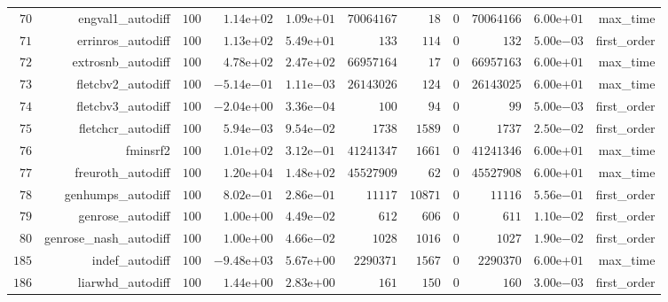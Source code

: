 \documentclass[varwidth=20cm,crop=true]{standalone}
\begin{document}
\begin{longtable}{rrrrrrrrrrr}
  \(    70\) & engval1\_autodiff & \(   100\) & \( 1.14\)e\(+02\) & \( 1.09\)e\(+01\) & \(70064167\) & \(    18\) & \(     0\) & \(70064166\) & \( 6.00\)e\(+01\) & max\_time \\
  \(    71\) & errinros\_autodiff & \(   100\) & \( 1.13\)e\(+02\) & \( 5.49\)e\(+01\) & \(   133\) & \(   114\) & \(     0\) & \(   132\) & \( 5.00\)e\(-03\) & first\_order \\
  \(    72\) & extrosnb\_autodiff & \(   100\) & \( 4.78\)e\(+02\) & \( 2.47\)e\(+02\) & \(66957164\) & \(    17\) & \(     0\) & \(66957163\) & \( 6.00\)e\(+01\) & max\_time \\
  \(    73\) & fletcbv2\_autodiff & \(   100\) & \(-5.14\)e\(-01\) & \( 1.11\)e\(-03\) & \(26143026\) & \(   124\) & \(     0\) & \(26143025\) & \( 6.00\)e\(+01\) & max\_time \\
  \(    74\) & fletcbv3\_autodiff & \(   100\) & \(-2.04\)e\(+00\) & \( 3.36\)e\(-04\) & \(   100\) & \(    94\) & \(     0\) & \(    99\) & \( 5.00\)e\(-03\) & first\_order \\
  \(    75\) & fletchcr\_autodiff & \(   100\) & \( 5.94\)e\(-03\) & \( 9.54\)e\(-02\) & \(  1738\) & \(  1589\) & \(     0\) & \(  1737\) & \( 2.50\)e\(-02\) & first\_order \\
  \(    76\) & fminsrf2 & \(   100\) & \( 1.01\)e\(+02\) & \( 3.12\)e\(-01\) & \(41241347\) & \(  1661\) & \(     0\) & \(41241346\) & \( 6.00\)e\(+01\) & max\_time \\
  \(    77\) & freuroth\_autodiff & \(   100\) & \( 1.20\)e\(+04\) & \( 1.48\)e\(+02\) & \(45527909\) & \(    62\) & \(     0\) & \(45527908\) & \( 6.00\)e\(+01\) & max\_time \\
  \(    78\) & genhumps\_autodiff & \(   100\) & \( 8.02\)e\(-01\) & \( 2.86\)e\(-01\) & \( 11117\) & \( 10871\) & \(     0\) & \( 11116\) & \( 5.56\)e\(-01\) & first\_order \\
  \(    79\) & genrose\_autodiff & \(   100\) & \( 1.00\)e\(+00\) & \( 4.49\)e\(-02\) & \(   612\) & \(   606\) & \(     0\) & \(   611\) & \( 1.10\)e\(-02\) & first\_order \\
  \(    80\) & genrose\_nash\_autodiff & \(   100\) & \( 1.00\)e\(+00\) & \( 4.66\)e\(-02\) & \(  1028\) & \(  1016\) & \(     0\) & \(  1027\) & \( 1.90\)e\(-02\) & first\_order \\
  \(   185\) & indef\_autodiff & \(   100\) & \(-9.48\)e\(+03\) & \( 5.67\)e\(+00\) & \(2290371\) & \(  1567\) & \(     0\) & \(2290370\) & \( 6.00\)e\(+01\) & max\_time \\
  \(   186\) & liarwhd\_autodiff & \(   100\) & \( 1.44\)e\(+00\) & \( 2.83\)e\(+00\) & \(   161\) & \(   150\) & \(     0\) & \(   160\) & \( 3.00\)e\(-03\) & first\_order \\

\end{longtable}
\end{document}
